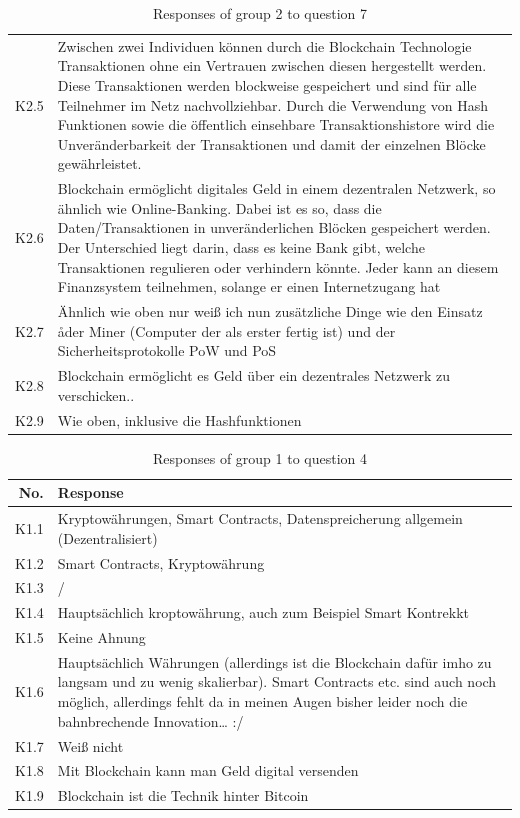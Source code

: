 \begin{table}[H]
\begin{tabularx}{\textwidth}{r|X}
         K2.5 & Zwischen zwei Individuen können durch die Blockchain Technologie Transaktionen ohne ein Vertrauen zwischen diesen hergestellt werden. Diese Transaktionen werden blockweise gespeichert und sind für alle Teilnehmer im Netz nachvollziehbar. Durch die Verwendung von Hash Funktionen sowie die öffentlich einsehbare Transaktionshistore wird die Unveränderbarkeit der Transaktionen und damit der einzelnen Blöcke gewährleistet. \\
         K2.6 & Blockchain  ermöglicht digitales Geld in einem dezentralen Netzwerk, so ähnlich wie Online-Banking. Dabei ist es so, dass die Daten/Transaktionen in unveränderlichen Blöcken gespeichert werden. Der Unterschied liegt darin, dass es keine Bank gibt, welche Transaktionen regulieren oder verhindern könnte. Jeder kann an diesem Finanzsystem teilnehmen, solange er einen Internetzugang hat \\
         K2.7 & Ähnlich wie oben nur weiß ich nun zusätzliche Dinge wie den Einsatz åder Miner (Computer der als erster fertig ist) und der Sicherheitsprotokolle PoW und PoS\\
         K2.8 & Blockchain ermöglicht es Geld über ein dezentrales Netzwerk zu verschicken.. \\
         K2.9 & Wie oben, inklusive die Hashfunktionen \\
    \end{tabularx}
    \caption{Responses of group 2 to question 7}
    \label{tab:Artefakt7}
\end{table}


\begin{table}[H]
    \centering
    \begin{tabularx}{\textwidth}{r|X}
        No. & Response \\ \hline
         K1.1 & Kryptowährungen, Smart Contracts, Datenspreicherung allgemein (Dezentralisiert)\\
         K1.2 & Smart Contracts, Kryptowährung \\
         K1.3 & /  \\
         K1.4 & Hauptsächlich kroptowährung, auch zum Beispiel Smart Kontrekkt \\
         K1.5 & Keine Ahnung \\
         K1.6 & Hauptsächlich Währungen (allerdings ist die Blockchain dafür imho zu langsam und zu wenig skalierbar). Smart Contracts etc. sind auch noch möglich, allerdings fehlt da in meinen Augen bisher leider noch die bahnbrechende Innovation… :/ \\
         K1.7 & Weiß nicht\\
         K1.8 & Mit Blockchain kann man Geld digital versenden \\
         K1.9 & Blockchain ist die Technik hinter Bitcoin \\
    \end{tabularx}
    \caption{Responses of group 1 to question 4}
    \label{tab:Video4}
\end{table}


